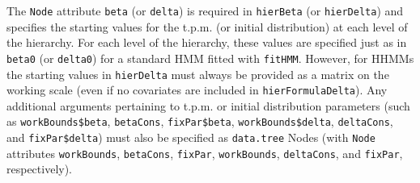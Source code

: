 \documentclass[12pt]{article}\usepackage[]{graphicx}\usepackage[]{color}
\begin{document}
\noindent The \verb|Node| attribute \verb|beta| (or \verb|delta|) is required in \verb|hierBeta| (or \verb|hierDelta|) and specifies the starting values for the t.p.m. (or initial distribution) at each level of the hierarchy. For each level of the hierarchy, these values are specified just as in \verb|beta0| (or \verb|delta0|) for a standard HMM fitted with \verb|fitHMM|. However, for HHMMs the starting values in \verb|hierDelta| must always be provided as a matrix on the working scale (even if no covariates are included in \verb|hierFormulaDelta|). Any additional arguments pertaining to t.p.m. or initial distribution parameters (such as \verb|workBounds$beta|, \verb|betaCons|, \verb|fixPar$beta|, \verb|workBounds$delta|, \verb|deltaCons|, and \verb|fixPar$delta|) must also be specified as \verb|data.tree| Nodes (with \verb|Node| attributes \verb|workBounds|, \verb|betaCons|, \verb|fixPar|, \verb|workBounds|, \verb|deltaCons|, and \verb|fixPar|, respectively).
\end{document}
